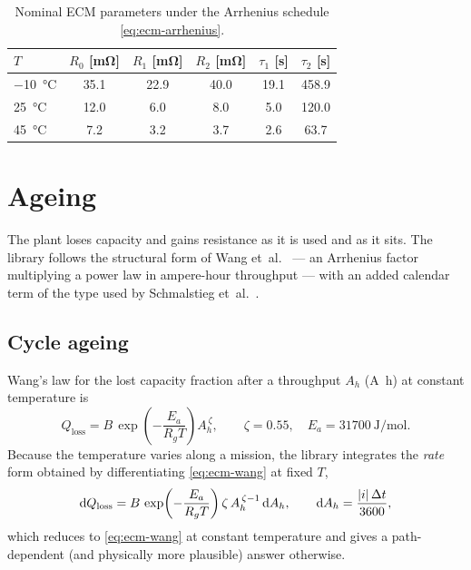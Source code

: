 \begin{table}[H]\centering
\caption{Nominal ECM parameters under the Arrhenius schedule \eqref{eq:ecm-arrhenius}.}
\label{tab:ecm-arrhenius}
\begin{tabular}{lccccc}\toprule
$T$ & $R_0$ [\si{\milli\ohm}] & $R_1$ [\si{\milli\ohm}] & $R_2$ [\si{\milli\ohm}]
    & $\tau_1$ [\si{\second}] & $\tau_2$ [\si{\second}] \\ \midrule
\SI{-10}{\celsius} & 35.1 & 22.9 & 40.0 & 19.1 & 458.9 \\
\SI{25}{\celsius}  & 12.0 &  6.0 &  8.0 &  5.0 & 120.0 \\
\SI{45}{\celsius}  &  7.2 &  3.2 &  3.7 &  2.6 &  63.7 \\
\bottomrule\end{tabular}
\end{table}

\section{Ageing}
\label{sec:ecm-aging}

The plant loses capacity and gains resistance as it is used and as it sits. The library follows
the structural form of Wang et~al.~\cite{wang2011cyclelife} --- an Arrhenius factor multiplying a
power law in ampere-hour throughput --- with an added calendar term of the type used by
Schmalstieg et~al.~\cite{schmalstieg2014aging}.

\subsection{Cycle ageing}
Wang's law for the lost capacity fraction after a throughput $A_h$ (\si{\ampere\hour}) at
constant temperature is
\begin{equation}
Q_{\mathrm{loss}} = B\,\exp\!\left(-\frac{E_a}{R_g T}\right) A_h^{\,\zeta},
\qquad \zeta = 0.55, \quad E_a = \SI{31700}{\joule\per\mole}.
\label{eq:ecm-wang}
\end{equation}
Because the temperature varies along a mission, the library integrates the \emph{rate} form
obtained by differentiating \eqref{eq:ecm-wang} at fixed $T$,
\begin{equation}
\mathrm{d}Q_{\mathrm{loss}} = B\,\exp\!\left(-\frac{E_a}{R_g T}\right)\zeta\,A_h^{\,\zeta-1}\,
 \mathrm{d}A_h, \qquad \mathrm{d}A_h = \frac{|i|\,\Delta t}{3600},
\label{eq:ecm-wang-rate}
\end{equation}
which reduces to \eqref{eq:ecm-wang} at constant temperature and gives a path-dependent
(and physically more plausible) answer otherwise.


